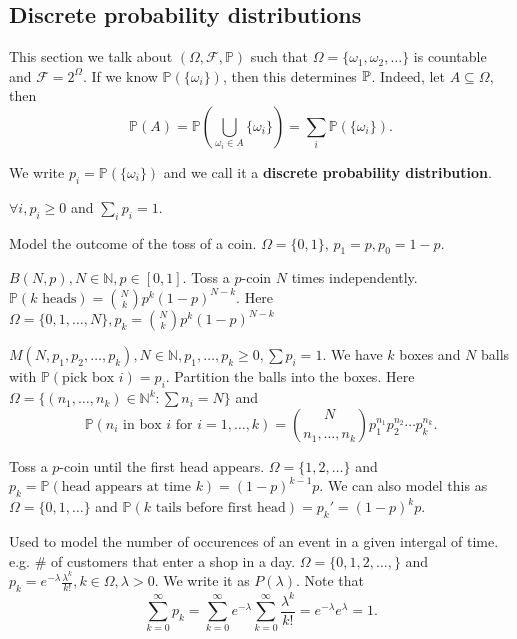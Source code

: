 \subsection{Discrete probability distributions}
This section we talk about $ (\Omega,\mathcal{F},\mathbb{P}) $ such that $ \Omega=\{\omega_1,\omega_2,\dots\} $ is countable and $ \mathcal{F} = 2^{\Omega} $. If we know $ \mathbb{P}(\{\omega_i\}) $, then this determines ${\mathbb{P}}$. Indeed, let $ A \subseteq \Omega $, then
\[
    \mathbb{P}(A) = \mathbb{P}\left( \bigcup_{\omega_i\in A}\{\omega_i\} \right) = \sum_{i} \mathbb{P}(\{\omega_i\}).
\]
\begin{definition}
    We write $ p_i = \mathbb{P}(\{\omega_i\}) $ and we call it a \textbf{discrete probability distribution}.
\end{definition}
\begin{proposition}
    $ \forall i,p_i\ge 0 $ and $ \sum_i p_i=1 $.
\end{proposition}

\begin{example}
    Model the outcome of the toss of a coin. $ \Omega = \{0,1\} $, $ p_1=p,p_0=1-p $.
\end{example}

\begin{example}
    $ B(N,p),N\in \mathbb{N}, p\in [0,1] $. Toss a $p$-coin $N$ times independently. $ \mathbb{P}(k\text{ heads}) = \binom{N}{k}p^k(1-p)^{N-k} $. Here $ \Omega=\{0,1,\dots,N\},p_k=\binom{N}{k}p^k(1-p)^{N-k} $
\end{example}

\begin{example}
    $ M(N,p_1,p_2,\dots,p_k), N\in \mathbb{N}, p_1,\dots,p_k\ge 0,\sum p_i=1 $. We have $k$ boxes and $N$ balls with $ \mathbb{P}(\text{pick box }i)=p_i $. Partition the balls into the boxes. Here $ \Omega = \{(n_1,\dots,n_k)\in \mathbb{N}^k: \sum n_i=N\} $ and 
    \[
        \mathbb{P}(n_i \text{ in box }i \text{ for } i=1,\dots,k) = \binom{N}{n_1,\dots,n_k}p_1^{n_1}p_2^{n_2}\cdots p_k^{n_k}.
    \]
\end{example}

\begin{example}
    Toss a $p$-coin until the first head appears. $ \Omega=\{1,2,\dots\} $ and $ p_k=\mathbb{P}(\text{head appears at time }k)=(1-p)^{k-1}p $. We can also model this as $ \Omega=\{0,1,\dots\} $ and $ \mathbb{P}(k \text{ tails before first head})=p_k'=(1-p)^{k}p $.
\end{example}

\begin{example}
    Used to model the number of occurences of an event in a given intergal of time. e.g. \# of customers that enter a shop in a day. $ \Omega=\{0,1,2,\dots,\} $ and $ p_k = e^{-\lambda}\frac{\lambda^k}{k!}, k\in \Omega, \lambda>0 $. We write it as $ P(\lambda) $. Note that 
    \[
        \sum_{k=0}^{\infty}p_k=\sum_{k=0}^{\infty} e^{-\lambda}\sum_{k=0}^{\infty}\frac{\lambda^k}{k!}=e^{-\lambda}e^\lambda=1.
    \]
\end{example}